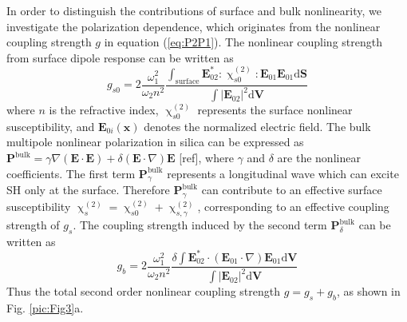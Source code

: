 \documentclass[a4paper,8pt,hyperref, twocolumn]{article}
\begin{document}
In order to distinguish the contributions of surface and bulk nonlinearity, we investigate the polarization dependence, which originates from the %
nonlinear coupling strength $g$ in equation (\ref{eq:P2P1}). %
The nonlinear coupling strength from surface dipole response can be written as
\begin{equation}
g_{s0} = 2\frac{\omega_1^2}{\omega_2n^2}\frac{\int_{\mathrm{surface} } \mathbf{E}_{02}^*:\upchi^{(2)}_{s0}:\mathbf{E}_{01}\mathbf{E}_{01} \mathrm{d}	\mathbf{S}}{\int |\mathbf{E}_{02}|^2 \mathrm{d}	\mathbf{V}}
\end{equation}
where $n$ is the refractive index, $\upchi^{(2)}_{s0}$ represents the surface nonlinear susceptibility, and $\mathbf{E}_{0i}(\mathbf{x})$ denotes the  normalized electric field. %
The bulk multipole nonlinear polarization in silica can be expressed as $\mathbf{P}^{\mathrm{bulk}} =  \gamma\nabla(\mathbf{E}\cdot\mathbf{E})+\delta(\mathbf{E}\cdot\nabla)\mathbf{E}$ [ref], where $\gamma$ and $\delta$ are the nonlinear coefficients. The first term $\mathbf{P}^{\mathrm{bulk}}_\gamma$ represents a longitudinal wave which can excite SH only at the surface. Therefore $\mathbf{P}^{\mathrm{bulk}}_\gamma$ can contribute to an effective surface susceptibility $\upchi^{(2)}_s = \upchi^{(2)}_{s0}+\upchi^{(2)}_{s,\gamma}$\cite{heinz1991second}, corresponding to an effective coupling strength of $g_s$. The coupling strength induced by the second term $\mathbf{P}^{\mathrm{bulk}}_\delta$ can be written as %
\begin{equation}
g_b =  2\frac{\omega_1^2}{\omega_2n^2}\frac{\delta \int \mathbf{E}_{02}^* \cdot (\mathbf{E}_{01}\cdot\nabla)\mathbf{E}_{01} \mathrm{d}	\mathbf{V}}{\int |\mathbf{E}_{02}|^2 \mathrm{d} \mathbf{V}}
\label{eq:gb}
\end{equation}
Thus the total second order nonlinear coupling strength $g = g_s+g_b$, as shown in Fig. \ref{pic:Fig3}a.
\end{document}
